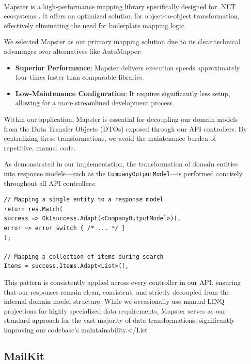 \paragraph{}Mapster is a high-performance mapping library specifically designed for .NET ecosystems \cite{mapster}. It offers an optimized solution for object-to-object transformation, effectively eliminating the need for boilerplate mapping logic.

We selected Mapster as our primary mapping solution due to its clear technical advantages over alternatives like AutoMapper:
\begin{itemize}
\item \textbf{Superior Performance}: Mapster delivers execution speeds approximately four times faster than comparable libraries.
\item \textbf{Low-Maintenance Configuration}: It requires significantly less setup, allowing for a more streamlined development process.
\end{itemize}

Within our application, Mapster is essential for decoupling our domain models from the Data Transfer Objects (DTOs) exposed through our API controllers. By centralizing these transformations, we avoid the maintenance burden of repetitive, manual code.

As demonstrated in our implementation, the transformation of domain entities into response models—such as the \texttt{CompanyOutputModel}—is performed concisely throughout all API controllers:

\begin{lstlisting}[caption={Concise domain-to-DTO transformation}, label={lst:mapster-controller}]
// Mapping a single entity to a response model
return res.Match(
success => Ok(success.Adapt(<CompanyOutputModel>)),
error => error switch { /* ... */ }
);

// Mapping a collection of items during search
Items = success.Items.Adapt<List>(),
\end{lstlisting}

This pattern is consistently applied across every controller in our API, ensuring that our responses remain clean, consistent, and strictly decoupled from the internal domain model structure. While we occasionally use manual LINQ projections for highly specialized data requirements, Mapster serves as our standard approach for the vast majority of data transformations, significantly improving our codebase's maintainability.</List

\subsection{MailKit}
